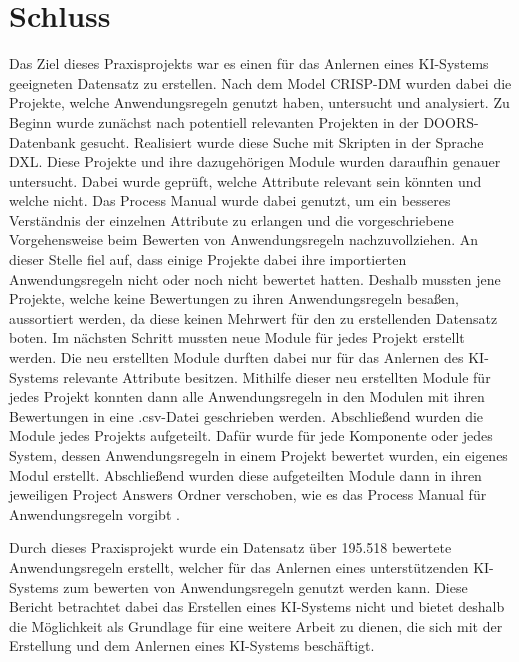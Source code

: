 \chapter{Schluss}
\label{chap:Schluss}
Das Ziel dieses Praxisprojekts war es einen für das Anlernen eines KI-Systems geeigneten Datensatz zu erstellen. Nach dem Model \acs{CRISP-DM} wurden dabei die Projekte, welche
Anwendungsregeln genutzt haben, untersucht und analysiert. Zu Beginn wurde zunächst nach potentiell relevanten Projekten in der \acs{DOORS}-Datenbank gesucht. Realisiert wurde diese Suche mit Skripten
in der Sprache \acs{DXL}.
Diese Projekte und ihre dazugehörigen Module wurden daraufhin genauer untersucht. Dabei wurde geprüft, welche Attribute relevant sein könnten und welche nicht. Das Process Manual wurde dabei genutzt,
um ein besseres Verständnis der einzelnen Attribute zu erlangen und die vorgeschriebene Vorgehensweise beim Bewerten von Anwendungsregeln nachzuvollziehen. An dieser Stelle fiel auf, dass einige
Projekte dabei ihre importierten Anwendungsregeln nicht oder noch nicht bewertet hatten. Deshalb mussten jene Projekte, welche keine Bewertungen zu ihren Anwendungsregeln besaßen, aussortiert werden,
da diese keinen Mehrwert für den zu erstellenden Datensatz boten. Im nächsten Schritt mussten neue Module für jedes Projekt erstellt werden. Die neu erstellten Module durften dabei nur für das Anlernen
des KI-Systems relevante Attribute besitzen. Mithilfe dieser neu erstellten Module für jedes Projekt konnten dann alle Anwendungsregeln in den Modulen mit ihren Bewertungen in eine .csv-Datei geschrieben 
werden. Abschließend wurden die Module jedes Projekts aufgeteilt. Dafür wurde für jede Komponente oder jedes System, dessen Anwendungsregeln in einem Projekt bewertet wurden, ein eigenes Modul erstellt. 
Abschließend wurden diese aufgeteilten Module dann in ihren jeweiligen Project Answers Ordner verschoben, wie es das Process Manual für Anwendungsregeln vorgibt \cite[S.32]{q2}. 

Durch dieses Praxisprojekt wurde ein Datensatz über 195.518 bewertete Anwendungsregeln erstellt, welcher für das Anlernen eines unterstützenden KI-Systems zum bewerten von Anwendungsregeln genutzt werden
kann. Diese Bericht betrachtet dabei das Erstellen eines KI-Systems nicht und bietet deshalb die Möglichkeit als Grundlage für eine weitere Arbeit zu dienen, die sich mit der Erstellung und dem Anlernen
eines KI-Systems beschäftigt.

